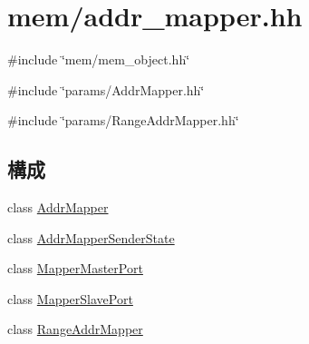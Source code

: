 \hypertarget{addr__mapper_8hh}{
\section{mem/addr\_\-mapper.hh}
\label{addr__mapper_8hh}
}
{\ttfamily \#include \char`\"{}mem/mem\_\-object.hh\char`\"{}}\par
{\ttfamily \#include \char`\"{}params/AddrMapper.hh\char`\"{}}\par
{\ttfamily \#include \char`\"{}params/RangeAddrMapper.hh\char`\"{}}\par
\subsection*{構成}
\begin{DoxyCompactItemize}
\item 
class \hyperlink{classAddrMapper}{AddrMapper}
\item 
class \hyperlink{classAddrMapper_1_1AddrMapperSenderState}{AddrMapperSenderState}
\item 
class \hyperlink{classAddrMapper_1_1MapperMasterPort}{MapperMasterPort}
\item 
class \hyperlink{classAddrMapper_1_1MapperSlavePort}{MapperSlavePort}
\item 
class \hyperlink{classRangeAddrMapper}{RangeAddrMapper}
\end{DoxyCompactItemize}
